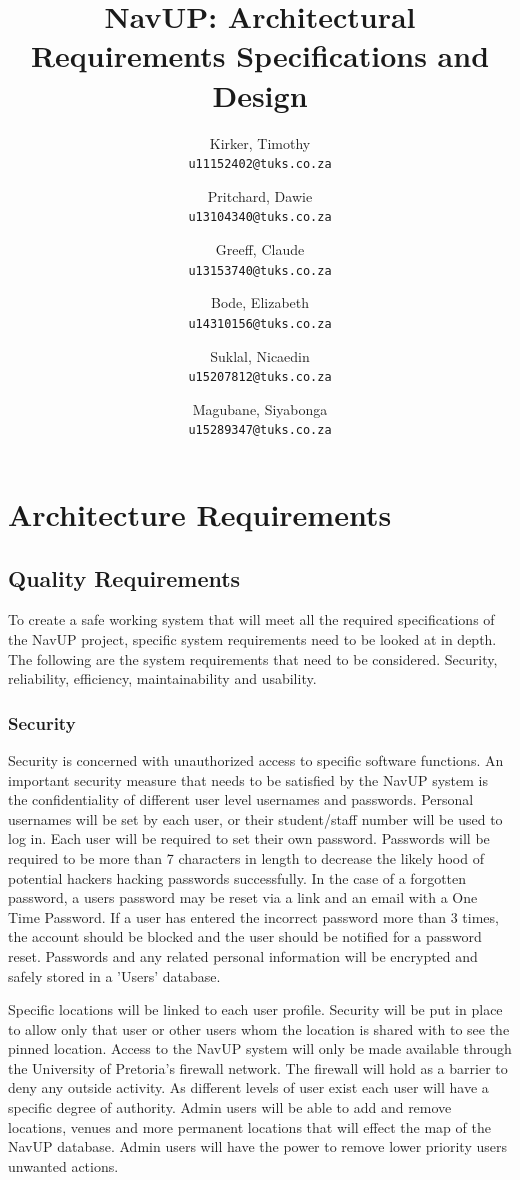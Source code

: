 \documentclass{article}
\title{NavUP: Architectural Requirements Specifications and Design}
\author{	 
	Kirker, Timothy\\
	\texttt{u11152402@tuks.co.za}
	\and
	Pritchard, Dawie\\
	\texttt{u13104340@tuks.co.za}
	\and
	Greeff, Claude\\
	\texttt{u13153740@tuks.co.za}
	\and
	Bode, Elizabeth\\
	\texttt{u14310156@tuks.co.za}
	\and
	Suklal, Nicaedin\\
	\texttt{u15207812@tuks.co.za}
	\and
	Magubane, Siyabonga\\
	\texttt{u15289347@tuks.co.za}		
}
\begin{document}
	\maketitle
	\section{Architecture Requirements}
		\subsection{Quality Requirements}
		 To create a safe working system that will meet all the required specifications of the NavUP project, specific system requirements need to be looked at in depth. The following are the system requirements that need to be considered. Security, reliability, efficiency, maintainability and usability.
		 
		 \subsubsection{Security}
		 Security is concerned with unauthorized access to specific software functions. An important security measure that needs to be satisfied by the NavUP system is the confidentiality of different user level usernames and passwords. Personal usernames will be set by each user, or their student/staff number will be used to log in. Each user will be required to set their own password. Passwords will be required to be more than 7 characters in length to decrease the likely hood of potential hackers hacking passwords successfully. In the case of a forgotten password, a users password may be reset via a link and an email with a One Time Password. If a user has entered the incorrect password more than 3 times, the account should be blocked and the user should be notified for a password reset. Passwords and any related personal information will be encrypted and safely stored in a 'Users' database.
		 
		  Specific locations will be linked to each user profile. Security will be put in place to allow only that user or other users whom the location is shared with to see the pinned location. Access to the NavUP system will only be made available through the University of Pretoria's firewall network. The firewall will hold as a barrier to deny any outside activity. As different levels of user exist each user will have a specific degree of authority. Admin users will be able to add and remove locations, venues and more permanent locations that will effect the map of the NavUP database. Admin users will have the power to remove lower priority users unwanted actions.
		 
\end{document}
